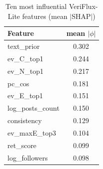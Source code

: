 \begin{table}[t]
\centering
\caption{Ten most influential VeriFlux-Lite features (mean $|$SHAP$|$)}
\label{tab:shap}
\footnotesize
\begin{tabular}{lc}
\toprule
Feature & mean $|\phi|$\\
\midrule
text\_prior & 0.302\\
ev\_C\_top1 & 0.244\\
ev\_N\_top1 & 0.217\\
pc\_cos & 0.181\\
ev\_E\_top1 & 0.151\\
log\_posts\_count & 0.150\\
consistency & 0.129\\
ev\_maxE\_top3 & 0.104\\
ret\_score & 0.099\\
log\_followers & 0.098\\
\bottomrule
\end{tabular}
\end{table}
